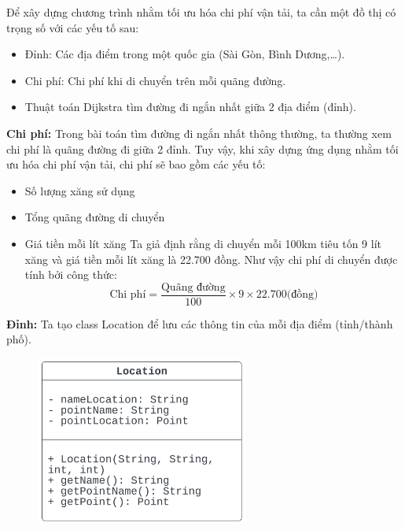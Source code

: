 \documentclass[a4paper]{article}
\begin{document}
Để xây dựng chương trình nhằm tối ưu hóa chi phí vận tải, ta cần một đồ thị có trọng số với các yếu tố sau:
\begin{itemize}
    \item Đỉnh: Các địa điểm trong một quốc gia (Sài Gòn, Bình Dương,…).
    \item Chi phí: Chi phí khi di chuyển trên mỗi quãng đường.
    \item Thuật toán Dijkstra tìm đường đi ngắn nhất giữa 2 địa điểm (đỉnh).
\end{itemize}
\textbf{Chi phí: }Trong bài toán tìm đường đi ngắn nhất thông thường, ta thường xem chi phí là quãng đường đi giữa 2 đỉnh. Tuy vậy, khi xây dựng ứng dụng nhằm tối ưu hóa chi phí vận tải, chi phí sẽ bao gồm các yếu tố:
\begin{itemize}
\item Số lượng xăng sử dụng
\item Tổng quãng đường di chuyển
\item Giá tiền mỗi lít xăng
Ta giả định rằng di chuyển mỗi 100km tiêu tốn 9 lít xăng và giá tiền mỗi lít xăng là 22.700 đồng. Như vậy chi phí di chuyển được tính bởi công thức:
$$\text{Chi phí} = \frac{\text{Quãng đường}}{100} \times 9 \times  22.700 \text{(đồng)}$$

\end{itemize}
\textbf{Đỉnh:} Ta tạo class Location để lưu các thông tin của mỗi địa điểm (tỉnh/thành phố).

\begin{figure}[!ht]
    \centering
    \includegraphics[width=7cm]{location.png}
    \label{fig:location}
\end{figure}
\end{document}

